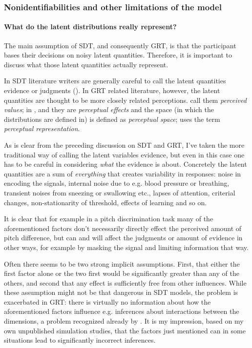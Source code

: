 \documentclass{article}\usepackage{knitr}
\begin{document}
\subsubsection{Nonidentifiabilities and other limitations of the model}

\paragraph{What do the latent distributions really represent?}

The main assumption of SDT, and consequently GRT, is that the participant bases their decisions on noisy latent quantities. Therefore, it is important to discuss what those latent quantities actually represent.  

In SDT literature writers are generally careful to call the latent quantities evidence \citep{wickens2002, verde2006} or judgments (\citealp[p. 247]{stigler2003}). In GRT related literature, however, the latent quantities are thought to be more closely related perceptions. \cite{ashby2015} call them \textit{perceived values}; in \cite{ashby1986},  \cite{kadlec1992} and \cite{silbert2009} they are \textit{perceptual effects} and the space (in which the distributions are defined in) is defined as \textit{perceptual space}; \cite{soto2017} uses the term \textit{perceptual representation}.

As is clear from the preceding discussion on SDT and GRT, I've taken the more traditional way of calling the latent variables evidence, but even in this case one has to be careful in considering \textit{what} the evidence is about. Concretely the latent quantities are a sum of \textit{everything} that creates variability in responses: noise in encoding the signals, internal noise due to e.g. blood pressure or breathing, transient noises from sneezing or swallowing etc., lapses of attention, criterial changes, non-stationarity of threshold, effects of learning and so on. 

It is clear that for example in a pitch discrimination task many of the aforementioned factors don't necessarily directly effect the perceived amount of pitch difference, but can and will affect the judgments or amount of evidence in other ways, for example by masking the signal and limiting information that way.

Often there seems to be two strong implicit assumptions. First, that either the first factor alone or the two first would be significantly greater than any of the others, and second that any effect is sufficiently free from other influences. While these assumption might not be that dangerous in SDT models, the problem is exacerbated in GRT: there is virtually no information about how the aforementioned factors influence e.g. inferences about interactions between the dimensions, a problem recognized already by \citet{silbert2009}. It is my impression, based on my own unpublished simulation studies, that the factors just mentioned can in some situations lead to significantly incorrect inferences. 
\end{document}

